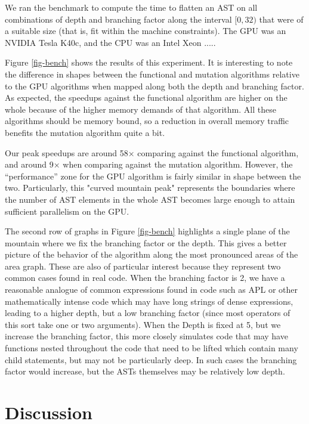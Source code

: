 ﻿\documentclass[numbers,10pt,preprint]{sigplanconf}
\begin{document}
We ran the benchmark to compute the time to flatten an AST on all combinations of depth and branching factor along the interval $[0,32)$ that were of a suitable size (that is, fit within the machine constraints). The GPU was an NVIDIA Tesla K40c, and the CPU was an Intel Xeon ..... 

Figure \ref{fig-bench} shows the results of this experiment. It is interesting to note the difference in shapes between the functional and mutation algorithms relative to the GPU algorithms when mapped along both the depth and branching factor. As expected, the speedups against the functional algorithm are higher on the whole because of the higher memory demands of that algorithm. All these algorithms should be memory bound, so a reduction in overall memory traffic benefits the mutation algorithm quite a bit. 

Our peak speedups are around 58× comparing against the functional algorithm, and around 9× when comparing against the mutation algorithm. However, the ``performance'' zone for the GPU algorithm is fairly similar in shape between the two. Particularly, this "curved mountain peak" represents the boundaries where the number of AST elements in the whole AST becomes large enough to attain sufficient parallelism on the GPU. 

The second row of graphs in Figure \ref{fig-bench} highlights a single plane of the mountain where we fix the branching factor or the depth. This gives a better picture of the behavior of the algorithm along the most pronounced areas of the area graph. These are also of particular interest because they represent two common cases found in real code. When the branching factor is 2, we have a reasonable analogue of common expressions found in code such as APL or other mathematically intense code which may have long strings of dense expressions, leading to a higher depth, but a low branching factor (since most operators of this sort take one or two arguments). When the Depth is fixed at 5, but we increase the branching factor, this more closely simulates code that may have functions nested throughout the code that need to be lifted which contain many child statements, but may not be particularly deep. In such cases the branching factor would increase, but the ASTs themselves may be relatively low depth. 

\section{Discussion}
\end{document}
